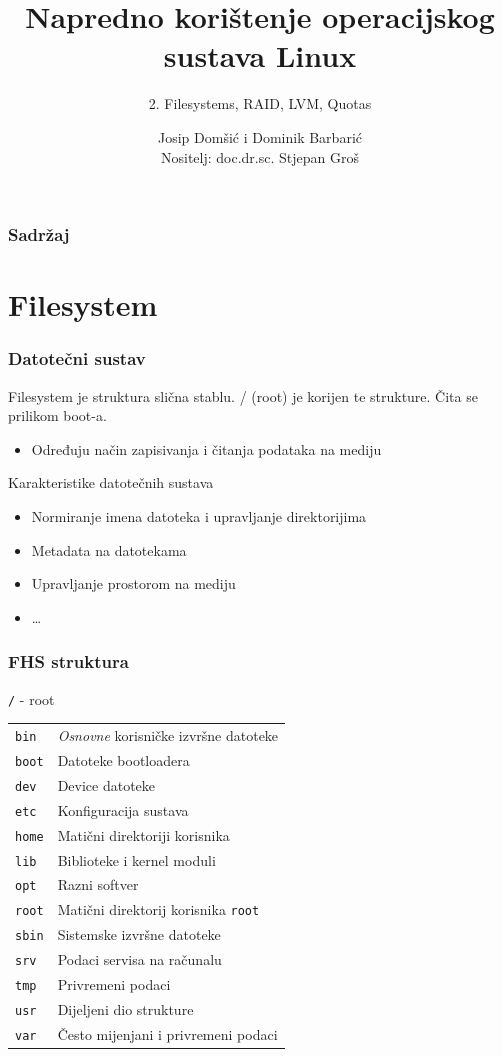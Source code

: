 \documentclass[t]{beamer}
\date{\todayiso}
\title[NKOSL]{Napredno korištenje operacijskog sustava Linux}
\author[Dominik Barbarić]{Josip Domšić i Dominik Barbarić\\ {\small Nositelj: doc.dr.sc. Stjepan Groš}}
\subtitle{2. Filesystems, RAID, LVM, Quotas}
\institute[FER]{Sveučilište u Zagrebu\\Fakultet elektrotehnike i računarstva}
\begin{document}
{
	\begin{frame}
		\maketitle
	\end{frame}
}

\begin{frame}
	\frametitle{Sadržaj}
	\tableofcontents
\end{frame}

\section{Filesystem}
\begin{frame}
	\frametitle{Datotečni sustav}
    Filesystem je struktura slična stablu. / (root) je korijen te strukture. Čita se prilikom boot-a.

	\begin{itemize}
		\item Određuju način zapisivanja i čitanja podataka na mediju
	\end{itemize}
	Karakteristike datotečnih sustava
	\begin{itemize}
		\item Normiranje imena datoteka i upravljanje direktorijima
		\item Metadata na datotekama
		\item Upravljanje prostorom na mediju
		\item \dots
    \end{itemize}
\end{frame}

\begin{frame}
	\frametitle{FHS struktura}
	\texttt{/} - root\\
	\begin{tabular}{p{3cm} l}
		\texttt{bin} & \emph{Osnovne} korisničke izvršne datoteke \\
		\texttt{boot} & Datoteke bootloadera \\
		\texttt{dev} & Device datoteke \\
		\texttt{etc} & Konfiguracija sustava \\
		\texttt{home} & Matični direktoriji korisnika \\
		\texttt{lib} & Biblioteke i kernel moduli \\
		\texttt{opt} & Razni softver \\
		\texttt{root} & Matični direktorij korisnika \texttt{root} \\
		\texttt{sbin} & Sistemske izvršne datoteke \\
		\texttt{srv} & Podaci servisa na računalu \\
		\texttt{tmp} & Privremeni podaci \\
		\texttt{usr} & Dijeljeni dio strukture \\
		\texttt{var} & Često mijenjani i privremeni podaci 
	\end{tabular}
\end{frame}
\end{document}
